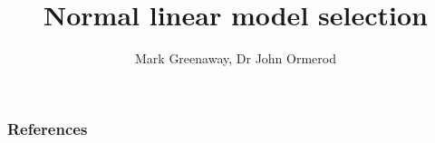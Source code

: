 \documentclass{beamer}
\title{Normal linear model selection}
\author{Mark Greenaway, Dr John Ormerod}
\begin{document}
\begin{frame}
	\titlepage
\end{frame}
			
\begin{frame}
	\frametitle{References}
	
	
\end{frame}

			
\end{document}

